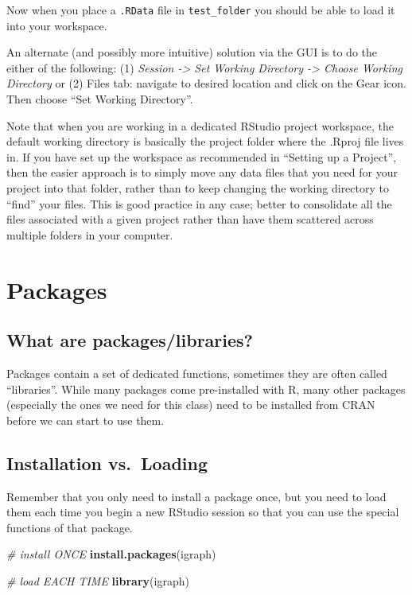 \documentclass[
]{book}
\newenvironment{Shaded}{\begin{snugshade}}{\end{snugshade}}
\newcommand{\CommentTok}[1]{\textcolor[rgb]{0.56,0.35,0.01}{\textit{#1}}}
\newcommand{\FunctionTok}[1]{\textcolor[rgb]{0.13,0.29,0.53}{\textbf{#1}}}
\newcommand{\NormalTok}[1]{#1}
\newcommand{\StringTok}[1]{\textcolor[rgb]{0.31,0.60,0.02}{#1}}
\begin{document}
Now when you place a \texttt{.RData} file in \texttt{test\_folder} you should be able to load it into your workspace.

An alternate (and possibly more intuitive) solution via the GUI is to do the either of the following: (1) \emph{Session -\textgreater{} Set Working Directory -\textgreater{} Choose Working Directory} or (2) Files tab: navigate to desired location and click on the Gear icon. Then choose ``Set Working Directory''.

Note that when you are working in a dedicated RStudio project workspace, the default working directory is basically the project folder where the .Rproj file lives in. If you have set up the workspace as recommended in ``Setting up a Project'', then the easier approach is to simply move any data files that you need for your project into that folder, rather than to keep changing the working directory to ``find'' your files. This is good practice in any case; better to consolidate all the files associated with a given project rather than have them scattered across multiple folders in your computer.

\section{Packages}\label{packages}

\subsection{What are packages/libraries?}\label{what-are-packageslibraries}

Packages contain a set of dedicated functions, sometimes they are often called ``libraries''. While many packages come pre-installed with R, many other packages (especially the ones we need for this class) need to be installed from CRAN before we can start to use them.

\subsection{Installation vs.~Loading}\label{installation-vs.-loading}

Remember that you only need to install a package once, but you need to load them each time you begin a new RStudio session so that you can use the special functions of that package.

\begin{Shaded}
\begin{Highlighting}[]
\CommentTok{\# install ONCE}
\FunctionTok{install.packages}\NormalTok{(}\StringTok{\textquotesingle{}igraph\textquotesingle{}}\NormalTok{)}

\CommentTok{\# load EACH TIME}
\FunctionTok{library}\NormalTok{(igraph)}
\end{Highlighting}
\end{Shaded}
\end{document}
